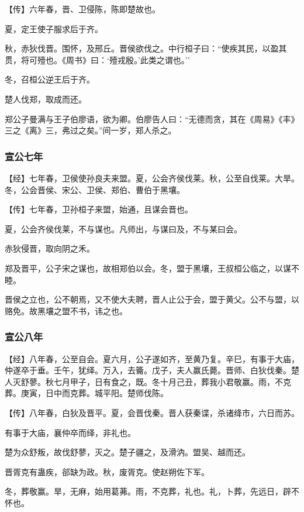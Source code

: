 \documentclass[]{article}
\begin{document}
【传】六年春，晋、卫侵陈，陈即楚故也。

夏，定王使子服求后于齐。

秋，赤狄伐晋。围怀，及邢丘。晋侯欲伐之。中行桓子曰：``使疾其民，以盈其贯，将可殪也。《周书》曰：`殪戎殷。'此类之谓也。''

冬，召桓公逆王后于齐。

楚人伐郑，取成而还。

郑公子曼满与王子伯廖语，欲为卿。伯廖告人曰：``无德而贪，其在《周易》《丰》三之《离》三，弗过之矣。''间一岁，郑人杀之。

\hypertarget{header-n1364}{%
\subsubsection{宣公七年}\label{header-n1364}}

【经】七年春，卫侯使孙良夫来盟。夏，公会齐侯伐莱。秋，公至自伐莱。大旱。冬，公会晋侯、宋公、卫侯、郑伯、曹伯于黑壤。

【传】七年春，卫孙桓子来盟，始通，且谋会晋也。

夏，公会齐侯伐莱，不与谋也。凡师出，与谋曰及，不与某曰会。

赤狄侵晋，取向阴之禾。

郑及晋平，公子宋之谋也，故相郑伯以会。冬，盟于黑壤，王叔桓公临之，以谋不睦。

晋侯之立也，公不朝焉，又不使大夫聘，晋人止公于会，盟于黄父。公不与盟，以赂免。故黑壤之盟不书，讳之也。

\hypertarget{header-n1373}{%
\subsubsection{宣公八年}\label{header-n1373}}

【经】八年春，公至自会。夏六月，公子遂如齐，至黄乃复。辛巳，有事于大庙，仲遂卒于垂。壬午，犹绎。万入，去籥。戊子，夫人赢氏薨。晋师、白狄伐秦。楚人灭舒蓼。秋七月甲子，日有食之，既。冬十月己丑，葬我小君敬赢。雨，不克葬。庚寅，日中而克葬。城平阳。楚师伐陈。

【传】八年春，白狄及晋平。夏，会晋伐秦。晋人获秦谍，杀诸绛市，六日而苏。

有事于大庙，襄仲卒而绎，非礼也。

楚为众舒叛，故伐舒蓼，灭之。楚子疆之，及滑汭。盟吴、越而还。

晋胥克有蛊疾，郤缺为政。秋，废胥克。使赵朔佐下军。

冬，葬敬赢。旱，无麻，始用葛茀。雨，不克葬，礼也。礼，卜葬，先远日，辟不怀也。
\end{document}
